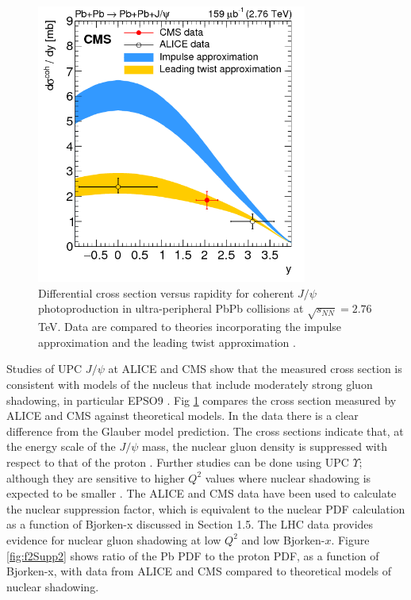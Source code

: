 \begin{figure}[h!]
\begin{centering}
\includegraphics[width=3.5in]{Chapter2/importfigs/patkenny_Figure_002.png}
\par\end{centering}
\caption{Differential cross section versus rapidity for coherent $J/\psi$ photoproduction in ultra-peripheral PbPb collisions at $\sqrt{s_{NN}}=2.76$ TeV. Data are compared to theories incorporating the impulse approximation and the leading twist approximation \cite{Khachatryan:2016qhq}. \label{fig:pk3}}
\end{figure}

Studies of UPC $J/\psi$ at ALICE and CMS show that the measured cross section is consistent with models of the nucleus that include moderately strong gluon shadowing, in particular EPSO9 \cite{lta2013.05,Eskola:2009uj}. Fig \ref{fig:pk3} compares the cross section measured by ALICE and CMS against theoretical models. In the data there is a clear difference from the Glauber model prediction. The cross sections indicate that, at the energy scale of the $J/\psi$ mass, the nuclear gluon density is suppressed with respect to that of the proton \cite{Frankfurt:2011cs}. Further studies can be done using UPC $\Upsilon$; although they are sensitive to higher $Q^2$ values where nuclear shadowing is expected to be smaller \cite{pQCD2013.02,Cisek:2012yt}. The ALICE and CMS data have been used to calculate the nuclear suppression factor, which is equivalent to the nuclear PDF calculation as a function of Bjorken-x discussed in Section 1.5. The LHC data provides evidence for nuclear gluon shadowing at low $Q^2$ and low Bjorken-$x$. Figure \ref{fig:f2Supp2} shows ratio of the Pb PDF to the proton PDF, as a function of Bjorken-x, with data from ALICE and CMS compared to theoretical models of nuclear shadowing.

